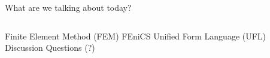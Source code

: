 \begin{frame}{What are we talking about today?}
\begin{columns}
\centering
\begin{outline}
  \1 Finite Element Method (FEM)
  \1 FEniCS 
  \1 Unified Form Language (UFL)
  \1 Discussion Questions (?)
\end{outline}

\begin{center}
\centering

\end{center}
\end{columns}
\end{frame}
